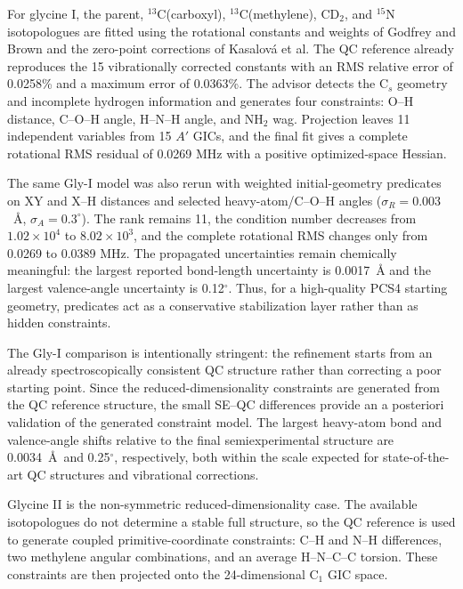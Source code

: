 \documentclass[aip,jcp,reprint,longbibliography,floatfix]{revtex4-2}
\begin{document}
For glycine I, the parent, $^{13}$C(carboxyl), $^{13}$C(methylene), CD$_2$,
and $^{15}$N isotopologues are fitted using the rotational constants and
weights of Godfrey and Brown\cite{GodfreyBrown1995ShapeGlycine} and the
zero-point corrections of Kasalov{\'a} et al.\cite{Kasalova2007Glycine} The
QC reference already reproduces the 15 vibrationally corrected constants
with an RMS relative error of 0.0258\% and a maximum error of 0.0363\%. The
advisor detects the C$_s$ geometry and incomplete hydrogen information and
generates four constraints: O--H distance, C--O--H angle, H--N--H angle, and
NH$_2$ wag. Projection leaves 11 independent variables from 15 $A'$ GICs, and
the final fit gives a complete rotational RMS residual of 0.0269 MHz with a
positive optimized-space Hessian.



The same Gly-I model was also rerun with weighted initial-geometry predicates
on XY and X--H distances and selected heavy-atom/C--O--H angles
($\sigma_R=0.003$~\AA{}, $\sigma_A=0.3^\circ$). The rank remains 11, the
condition number decreases from $1.02\times10^4$ to $8.02\times10^3$, and the
complete rotational RMS changes only from 0.0269 to 0.0389 MHz. The propagated
uncertainties remain chemically meaningful: the largest reported bond-length
uncertainty is 0.0017~\AA{} and the largest valence-angle uncertainty is
0.12$^\circ$. Thus, for a high-quality PCS4 starting geometry, predicates act
as a conservative stabilization layer rather than as hidden constraints.

The Gly-I comparison is intentionally stringent: the refinement starts from an already
spectroscopically consistent QC structure rather than correcting a poor
starting point. Since the reduced-dimensionality constraints are generated
from the QC reference structure, the small SE--QC differences provide an
a posteriori validation of the generated constraint model. The
largest heavy-atom bond and valence-angle shifts relative to the final
semiexperimental structure are 0.0034~\AA\ and 0.25$^\circ$, respectively,
both within the scale expected for state-of-the-art QC structures and vibrational
corrections.\cite{PuzzariniStanton2023,Mendolicchio2025FastDvib}

Glycine II is the non-symmetric reduced-dimensionality case. The available
isotopologues do not determine a stable full structure, so the QC reference
is used to generate coupled primitive-coordinate constraints: C--H and N--H
differences, two methylene angular combinations, and an average H--N--C--C
torsion. These constraints are then projected onto the
24-dimensional C$_1$ GIC space.
\end{document}

